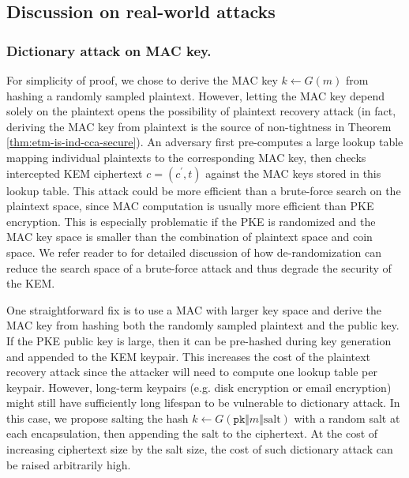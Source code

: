 \documentclass[runningheads]{llncs}
\newcommand{\pk}{\texttt{pk}}
\begin{document}
\subsection{Discussion on real-world attacks}\label{sec:discussion-on-real-world-attacks}
\subsubsection{Dictionary attack on MAC key.} For simplicity of proof, we chose to derive the MAC key $k \leftarrow G(m)$ from hashing a randomly sampled plaintext. However, letting the MAC key depend solely on the plaintext opens the possibility of plaintext recovery attack (in fact, deriving the MAC key from plaintext is the source of non-tightness in Theorem \ref{thm:etm-is-ind-cca-secure}). An adversary first pre-computes a large lookup table mapping individual plaintexts to the corresponding MAC key, then checks intercepted KEM ciphertext $c = (c^\prime, t)$ against the MAC keys stored in this lookup table. This attack could be more efficient than a brute-force search on the plaintext space, since MAC computation is usually more efficient than PKE encryption. This is especially problematic if the PKE is randomized and the MAC key space is smaller than the combination of plaintext space and coin space. We refer reader to \cite{DBLP:journals/iacr/Bernstein21,cryptoeprint:2021/912} for detailed discussion of how de-randomization can reduce the search space of a brute-force attack and thus degrade the security of the KEM.

One straightforward fix is to use a MAC with larger key space and derive the MAC key from hashing both the randomly sampled plaintext and the public key. If the PKE public key is large, then it can be pre-hashed during key generation and appended to the KEM keypair. This increases the cost of the plaintext recovery attack since the attacker will need to compute one lookup table per keypair. However, long-term keypairs (e.g. disk encryption or email encryption) might still have sufficiently long lifespan to be vulnerable to dictionary attack. In this case, we propose salting the hash $k \leftarrow G(\pk \Vert m \Vert \text{salt})$ with a random salt at each encapsulation, then appending the salt to the ciphertext. At the cost of increasing ciphertext size by the salt size, the cost of such dictionary attack can be raised arbitrarily high.

\end{document}
